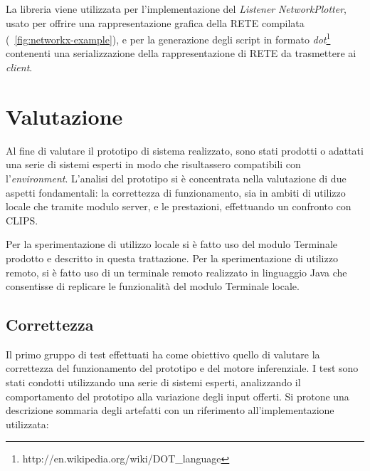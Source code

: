 La libreria viene utilizzata per l'implementazione del \emph{Listener} \emph{NetworkPlotter}, usato per offrire una rappresentazione grafica della RETE compilata (\figurename~\ref{fig:networkx-example}), e per la generazione degli script in formato \emph{dot}\footnote{http://en.wikipedia.org/wiki/DOT\_language} contenenti una serializzazione della rappresentazione di RETE da trasmettere ai \emph{client}.

\section{Valutazione}

Al fine di valutare il prototipo di sistema realizzato, sono stati prodotti o adattati una serie di sistemi esperti in modo che risultassero compatibili con l'\emph{environment}. L'analisi del prototipo si è concentrata nella valutazione di due aspetti fondamentali: la correttezza di funzionamento, sia in ambiti di utilizzo locale che tramite modulo server, e le prestazioni, effettuando un confronto con CLIPS.

Per la sperimentazione di utilizzo locale si è fatto uso del modulo Terminale prodotto e descritto in questa trattazione. Per la sperimentazione di utilizzo remoto, si è fatto uso di un terminale remoto realizzato in linguaggio Java che consentisse di replicare le funzionalità del modulo Terminale locale.

\subsection{Correttezza}

Il primo gruppo di test effettuati ha come obiettivo quello di valutare la correttezza del funzionamento del prototipo e del motore inferenziale. I test sono stati condotti utilizzando una serie di sistemi esperti, analizzando il comportamento del prototipo alla variazione degli input offerti. Si protone una descrizione sommaria degli artefatti con un riferimento all'implementazione utilizzata:

